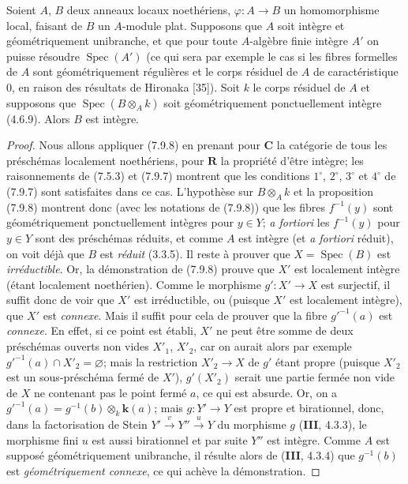 \begin{corollary}[7.9.9]
\label{IV.2.s7.9.9-fr}
Soient $A$, $B$ deux anneaux locaux noethériens, $\varphi:A\to B$ un
homomorphisme local, faisant de $B$ un $A$-module plat. Supposons que $A$ soit
intègre et géométriquement unibranche, et que pour toute $A$-algèbre finie
intègre $A'$ on puisse résoudre $\operatorname{Spec}(A')$ \textup{(ce qui sera par
exemple le cas si les fibres formelles de $A$ sont géométriquement régulières
et le corps résiduel de $A$ de caractéristique $0$, en raison des résultats de
Hironaka [35])}. Soit $k$ le corps résiduel de $A$ et supposons que
$\operatorname{Spec}(B\otimes_Ak)$ soit géométriquement ponctuellement intègre
\textup{(4.6.9)}. Alors $B$ est intègre.
\end{corollary}

\begin{proof}
Nous allons appliquer (7.9.8) en prenant pour $\boldsymbol{C}$ la catégorie de
tous les préschémas localement noethériens, pour $\boldsymbol R$ la propriété
d'être intègre; les raisonnements de (7.5.3) et (7.9.7) montrent que les
conditions $1^\circ$, $2^\circ$, $3^\circ$ et $4^\circ$ de (7.9.7) sont
satisfaites dans ce cas. L'hypothèse sur $B\otimes_Ak$ et la proposition
(7.9.8) montrent donc (avec les notations de (7.9.8)) que les fibres
$f^{-1}(y)$ sont géométriquement ponctuellement intègres pour $y\in Y$;
\emph{a fortiori} les $f^{-1}(y)$ pour $y\in Y$ sont des préschémas réduits,
et comme $A$ est intègre (et \emph{a fortiori} réduit), on voit déjà que $B$
est \emph{réduit} (3.3.5). Il reste à prouver que $X=\operatorname{Spec}(B)$ est
\emph{irréductible}. Or, la démonstration de (7.9.8) prouve que $X'$ est localement
intègre (étant localement noethérien). Comme le morphisme $g':X'\to X$ est
surjectif, il suffit donc de voir que $X'$ est irréductible, ou (puisque $X'$
est localement intègre), que $X'$ est \emph{connexe}. Mais il suffit pour cela de
prouver que la fibre $g'^{-1}(a)$ est \emph{connexe}. En effet, si ce point est
établi, $X'$ ne peut être somme de deux préschémas ouverts non vides $X'_1$,
$X'_2$, car on aurait alors par exemple
$g'^{-1}(a)\cap X'_2=\varnothing$; mais la restriction $X'_2\to X$ de $g'$
étant propre (puisque $X'_2$ est un sous-préschéma fermé de $X'$),
$g'(X'_2)$ serait une partie fermée non vide de $X$ ne contenant pas le point
fermé $a$, ce qui est absurde.
Or, on a
$g'^{-1}(a)=g^{-1}(b)\otimes_k \boldsymbol{k}(a)$; mais $g:Y'\to Y$ est propre et
birationnel, donc, dans la factorisation de Stein
$Y'\xrightarrow{v}Y''\xrightarrow{u}Y$ du morphisme $g$ (\textbf{III}, 4.3.3),
le morphisme fini $u$ est aussi birationnel et par suite $Y''$ est intègre.
Comme $A$ est supposé géométriquement unibranche, il résulte alors de
(\textbf{III}, 4.3.4) que $g^{-1}(b)$ est \emph{géométriquement connexe}, ce qui
achève la démonstration.
\end{proof}


